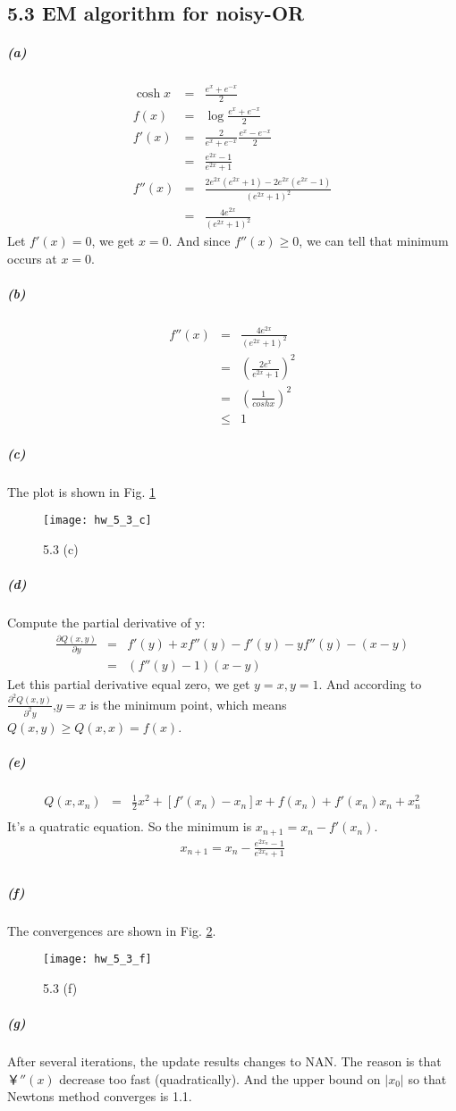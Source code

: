 \documentclass{article}
\begin{document}
\subsection*{5.3 EM algorithm for noisy-OR}
\subparagraph*{(a)}
\begin{eqnarray*}
	\cosh x &=& \frac{e^x + e^{-x}}{2}\\
	f(x) &=& \log \frac{e^x + e^{-x}}{2}\\
	f'(x) &=& \frac{2}{e^x + e^{-x}} \frac{e^x - e^{-x}}{2}\\
	&=& \frac{e^{2x}-1}{e^{2x}+1}\\
	f''(x) &=& \frac{2e^{2x}(e^{2x}+1) - 2e^{2x}(e^{2x}-1)}{(e^{2x}+1)^2}\\
	&=& \frac{4e^{2x}}{(e^{2x}+1)^2}
\end{eqnarray*}
Let $f'(x)=0$, we get $x=0$. And since $f''(x) \ge 0$, we can tell that minimum occurs at $x=0$.

\subparagraph*{(b)}
\begin{eqnarray*}
	f''(x) &=& \frac{4e^{2x}}{(e^{2x}+1)^2}\\
	&=& \left(\frac{2e^x}{e^{2x}+1}\right)^2\\
	&=& \left(\frac{1}{coshx}\right)^2\\
	&\le& 1
\end{eqnarray*}

\subparagraph*{(c)}
The plot is shown in Fig. \ref{hw_5_3_c}
\begin{figure}
	\centering
	\texttt{[image: hw\_5\_3\_c]}
	\label{hw_5_3_c}
	\caption{5.3 (c)}
\end{figure}

\subparagraph*{(d)}
Compute the partial derivative of y:
\begin{eqnarray*}
	\frac{\partial Q(x,y)}{\partial y} &=& f'(y) + xf''(y) - f'(y)-yf''(y)-(x-y)\\
	&=& (f''(y)-1)(x-y)
\end{eqnarray*}
Let this partial derivative equal zero, we get $y=x, y=1$. And according to $\frac{\partial^2 Q(x,y)}{\partial^2 y}$,$y=x$ is the minimum point, which means $Q(x,y) \ge Q(x,x) = f(x)$.

\subparagraph*{(e)}
\begin{eqnarray*}
	Q(x, x_n) &=& \frac{1}{2}x^2 + [f'(x_n) - x_n]x + f(x_n) + f'(x_n)x_n + x_n^2\\
\end{eqnarray*}
It's a quatratic equation. So the minimum is $x_{n+1}=x_n - f'(x_n)$.
\begin{eqnarray*}
	x_{n+1}=x_n - \frac{e^{2x_n}-1}{e^{2x_n}+1}\\
\end{eqnarray*}

\subparagraph*{(f)}
The convergences are shown in Fig. \ref{hw_5_3_f}.
\begin{figure}
	\centering
	\texttt{[image: hw\_5\_3\_f]}
	\label{hw_5_3_f}
	\caption{5.3 (f)}
\end{figure}
\subparagraph*{(g)}
After several iterations, the update results changes to NAN. The reason is that ￥$''(x)$ decrease too
fast (quadratically). And the upper bound on $|x_0|$ so that Newtons method converges is 1.1.
\end{document}
